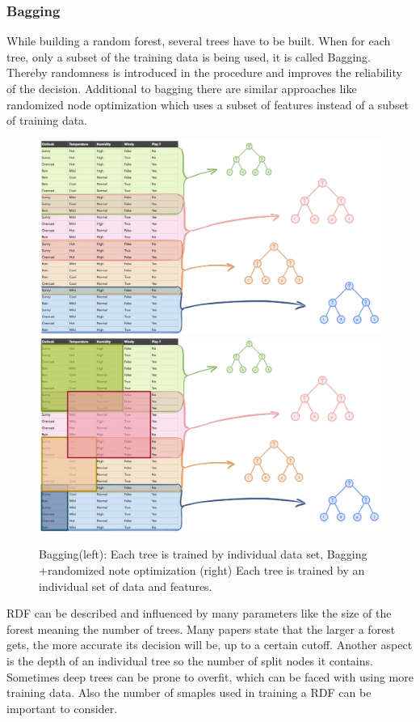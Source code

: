 \documentclass[
12pt,
headsepline,
bibliography=totoc,
twoside=semi,
fleqn
]{scrartcl}
\begin{document}
 \subsubsection{Bagging\label{sec:sec2-2-1}}
 While building a random forest, several trees have to be built. When for each tree, only a subset of the training data is being used, it is called Bagging. Thereby randomness is introduced in the procedure and improves the reliability of the decision. Additional to bagging there are similar approaches like randomized node optimization which uses a subset of features instead of a subset of training data.  
 
 \begin{figure}[H]
 \includegraphics[scale=0.4]{BDT12.png}\label{fig:fig12}
 \includegraphics[scale=0.4]{BDT13.png}\label{fig:fig13}
 \caption{Bagging(left): Each tree is trained by individual data set, Bagging +randomized note optimization (right) Each tree is trained by an individual set of data and features.}

 \end{figure}

RDF can be described and influenced by many parameters like the size of the forest meaning the number of trees. Many papers state that the larger a forest gets, the more accurate its decision will be, up to a certain cutoff. Another aspect is the depth of an individual tree so the number of split nodes it contains. Sometimes deep trees can be prone to overfit, which can be faced with using more training data. Also the number of smaples used in training a RDF can be important to consider.
\end{document}
